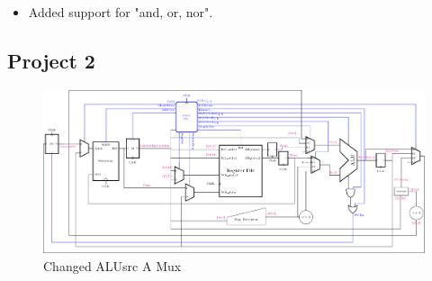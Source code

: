 \documentclass{article}
\begin{document}
\begin{itemize}
    \item Added support for "and, or, nor".
\end{itemize}

\subsection*{Project 2}
\begin{figure}[H]
    \begin{center}
        \includegraphics[scale=0.7]{MultiCycleImplementation_NewOnes/TexFiles/MultiCylcle_NewOnes2.pdf}
        \caption*{Changed ALUsrc A Mux}
    \end{center}
\end{figure}
\end{document}
